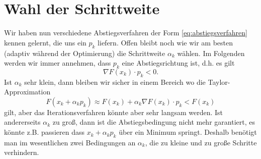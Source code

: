 \section{Wahl der Schrittweite} 

Wir haben nun verschiedene Abstiegsverfahren der Form \eqref{eq:abstiegsverfahren} kennen gelernt, die uns ein $p_k$ liefern. Offen bleibt noch wie wir am besten (adaptiv w\"ahrend der Optimierung) die Schrittweite $\alpha_k$ w\"ahlen. Im Folgenden werden wir immer annehmen, dass $p_k$ eine Abstiegsrichtung ist, d.h. es gilt 
\begin{equation}
\nabla F(x_k) \cdot p_k  < 0. 
\end{equation}
Ist $\alpha_k$ sehr klein, dann bleiben wir sicher in einem Bereich wo die Taylor-Approximation 
$$ F(x_k +\alpha_k p_k) \approx F(x_k) + \alpha_k \nabla F(x_k) \cdot p_k  < F(x_k) $$
gilt, aber das Iterationsverfahren k\"onnte aber sehr langsam werden. Ist andererseits $\alpha_k$ zu gro{\ss}, dann ist die Abstiegsbedingung nicht mehr garantiert, es k\"onnte z.B. passieren dass $x_k + \alpha_k p_k$ \"uber ein Minimum springt. Deshalb ben\"otigt man im wesentlichen zwei Bedingungen an $\alpha_k$, die zu kleine und zu gro{\ss}e Schritte verhindern.

